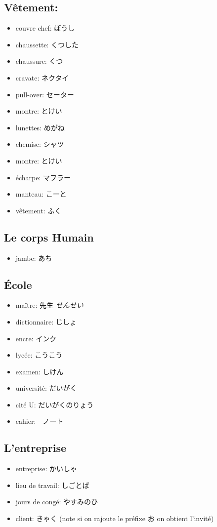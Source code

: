 \documentclass{article}
\begin{document}
\begin{CJK}{UTF8}{min}
   \subsection{Vêtement:}
   \begin{itemize}
       \item couvre chef: ぼうし
       \item chaussette: くつした
        \item chaussure: くつ
        \item cravate: ネクタイ
        \item pull-over: セーター
        \item montre: とけい
        \item lunettes: めがね
        \item chemise: シャツ
        \item montre: とけい
        \item écharpe: マフラー
        \item manteau: こーと
        \item vêtement: ふく
   \end{itemize}

   \subsection{Le corps Humain}
   \begin{itemize}
       \item jambe: あち
   \end{itemize}

    \subsection{\'{E}cole}
   \begin{itemize}
       \item maître: 先生 \textit{せんせい}
       \item dictionnaire: じしょ
       \item encre: インク
       \item lycée: こうこう
       \item examen: しけん
       \item université: だいがく
       \item cité U: だいがくのりょう
       \item cahier:　ノート
   \end{itemize}

   \subsection{L'entreprise}
   \begin{itemize}
       \item entreprise: かいしゃ
        \item lieu de travail: しごとば
        \item jours de congé: やすみのひ
        \item client: きゃく (note si on rajoute le préfixe お on obtient l'invité)
   \end{itemize}


\end{CJK}
\end{document}
